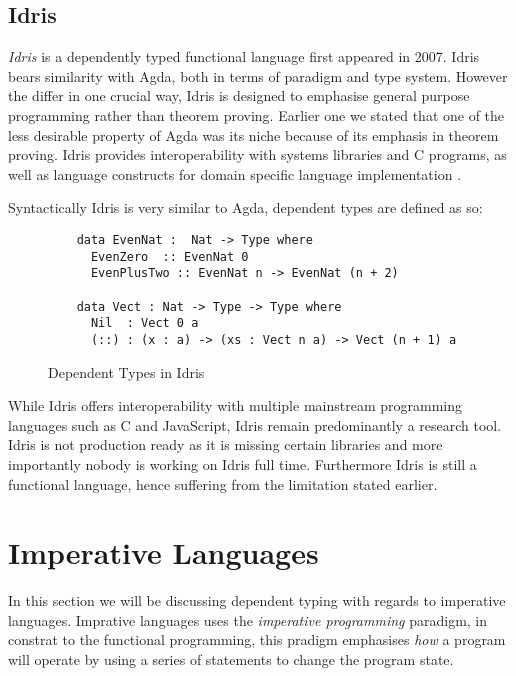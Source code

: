 \documentclass[a4paper,12pt]{report}
\begin{document}
\subsection{Idris}
\textit{Idris} \cite{idris} is a dependently typed functional language first 
appeared in 2007. Idris bears similarity with Agda, both in terms of paradigm 
and type system. However the differ in one crucial way, Idris is designed to 
emphasise general purpose programming rather than theorem proving. Earlier one 
we stated that one of the less desirable property of Agda was its niche because 
of its emphasis in theorem proving. Idris provides 
interoperability with systems libraries and C programs, 
as well as language constructs for domain specific language 
implementation \cite{gpIdris}. 

\par
Syntactically Idris is very similar to Agda, dependent types are defined as so: 
\begin{figure}[H]
  \begin{lstlisting}      
    data EvenNat :  Nat -> Type where
      EvenZero  :: EvenNat 0
      EvenPlusTwo :: EvenNat n -> EvenNat (n + 2)
      
    data Vect : Nat -> Type -> Type where
      Nil  : Vect 0 a
      (::) : (x : a) -> (xs : Vect n a) -> Vect (n + 1) a
  \end{lstlisting}
  \caption{Dependent Types in Idris}
\end{figure}

\par
While Idris offers interoperability with multiple mainstream programming 
languages such as C and JavaScript, Idris remain predominantly a research tool. 
Idris is not production ready \cite{gpIdris} as it is missing certain libraries 
and more importantly nobody is working on Idris full time. Furthermore Idris is 
still a functional language, hence suffering from the limitation stated earlier. 

\section{Imperative Languages}

In this section we will be discussing dependent typing with regards to imperative 
languages. Imprative languages uses the \textit{imperative programming} 
\cite{imperativeOverview} paradigm, in constrat to the functional 
programming, this pradigm emphasises \textit{how} a program will operate 
by using a series of statements to change the program state.
\end{document}
